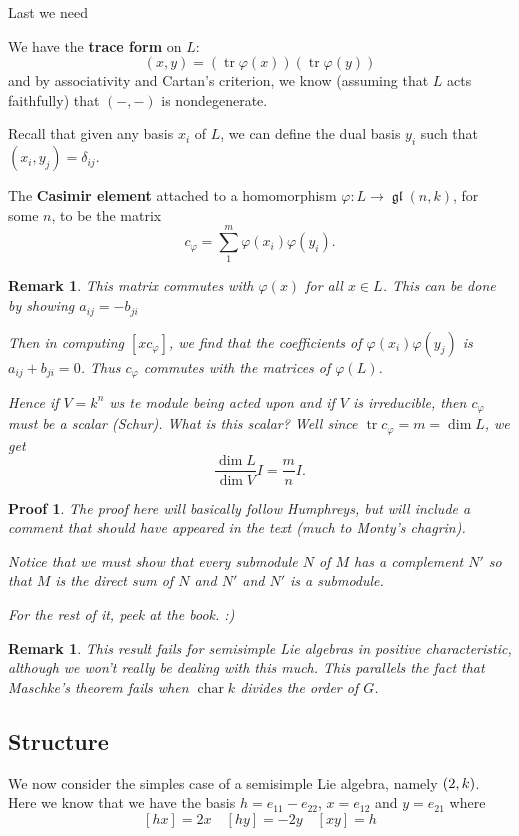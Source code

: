 \documentclass[12pt]{article}
\theoremstyle{nonumberbreak}
\theoremstyle{changebreak}
\theoremstyle{nonumberbreak}
\newtheorem{prf}{Proof}
\theoremstyle{change}
\newtheorem{rmk}[thm]{Remark}
\DeclareMathOperator{\ch}{char}
\DeclareMathOperator{\gl}{\mathfrak{gl}}
\let\sl\relax
\DeclareMathOperator{\sl}{\mathfrak{sl}}
\DeclareMathOperator{\tr}{tr}
\begin{document}
Last we need
\begin{defn}
	We have the \textbf{trace form} on $L$:
	\[(x,y)=(\tr\varphi(x))(\tr\varphi(y))\]
	and by associativity and Cartan's criterion, we know (assuming that $L$ acts faithfully) that $(-,-)$ is nondegenerate.
\end{defn}
Recall that given any basis $x_i$ of $L$, we can define the dual basis $y_i$ such that $(x_i,y_j)=\delta_{ij}$.
\begin{defn}
	The \textbf{Casimir element} attached to a homomorphism $\varphi:L\to\gl(n,k)$, for some $n$, to be the matrix
	\[c_\varphi=\sum_1^m\varphi(x_i)\varphi(y_i).\]
\end{defn}
\begin{rmk}
	This matrix commutes with $\varphi(x)$ for all $x\in L$. This can be done by showing $a_{ij}=-b_{ji}$

	Then in computing $[xc_\varphi]$, we find that the coefficients of $\varphi(x_i)\varphi(y_j)$
	is $a_{ij}+b_{ji}=0$. Thus $c_\varphi$ commutes with the matrices of $\varphi(L)$.

	Hence if $V=k^n$ ws te module being acted upon and if $V$ is irreducible, then $c_\varphi$ must be a scalar (Schur).
	What is this scalar? Well since $\tr c_\varphi=m=\dim L$, we get
	\[\frac{\dim L}{\dim V}I=\frac{m}{n}I.\]
\end{rmk}
\begin{prf}
	The proof here will basically follow Humphreys, but will include a comment that \textit{should have appeared} in the text
	(much to Monty's chagrin).

	Notice that we must show that every submodule $N$ of $M$ has a complement $N'$ so that $M$ is the direct sum of $N$ and $N'$ and $N'$ is a submodule.

	For the rest of it, peek at the book. :)
\end{prf}
\begin{rmk}
	This result fails for semisimple Lie algebras in positive characteristic, although we won't really be dealing with this much.
	This parallels the fact that Maschke's theorem fails when $\ch k$ divides the order of $G$.
\end{rmk}
\subsection{Structure}
We now consider the simples case of a semisimple Lie algebra, namely $\sl(2,k)$. Here we know that we have the basis
$h=e_{11}-e_{22}$, $x=e_{12}$ and $y=e_{21}$ where
\[[hx]=2x\quad [hy]=-2y\quad [xy]=h\]
\end{document}
